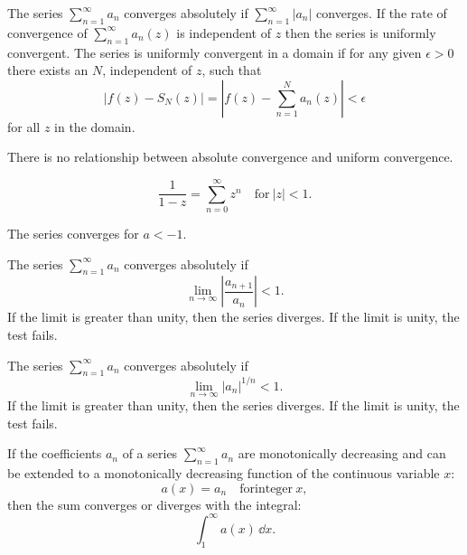 \begin{QuizSolution}
  \label{quiz solution absolute uniform convergence}
  The series $\sum_{n=1}^\infty a_n$ converges absolutely if $\sum_{n=1}^\infty |a_n|$
  converges.
  If the rate of convergence of $\sum_{n=1}^\infty a_n(z)$ is independent of $z$ then 
  the series is uniformly convergent.  
  The series is uniformly convergent in a domain if for any given 
  $\epsilon > 0$ there exists an $N$, independent of $z$, such that
  \[
  |f(z) - S_{N}(z)|
  = \left|f(z) - \sum_{n=1}^{N} a_n(z) \right| < \epsilon
  \]
  for all $z$ in the domain.

  There is no relationship between absolute convergence and 
  uniform convergence.
\end{QuizSolution}


\begin{QuizSolution}
  \label{quiz solution geometric series}
  \[
  \frac{1}{1-z} = \sum_{n=0}^\infty z^n \quad \mathrm{for}\ |z| < 1.
  \]
\end{QuizSolution}


\begin{QuizSolution}
  \label{quiz solution convergence na}
  The series converges for $a < -1$.
\end{QuizSolution}


\begin{QuizSolution}
  \label{quiz solution ratio root convergence}
  The series $\sum_{n=1}^\infty a_n$ converges absolutely if
  \[
  \lim_{n \to \infty} \left| \frac{a_{n+1}}{a_n} \right| < 1.
  \]
  If the limit is greater than unity, then the series diverges.  If the
  limit is unity, the test fails.

  The series $\sum_{n=1}^\infty a_n$ converges absolutely if
  \[
  \lim_{n \to \infty} |a_n|^{1/n} < 1.
  \]
  If the limit is greater than unity, then the series diverges.  If the
  limit is unity, the test fails.
\end{QuizSolution}


\begin{QuizSolution}
  \label{quiz solution integral convergence test}
  If the coefficients $a_n$ of a series $\sum_{n=1}^\infty a_n$
  are monotonically decreasing and
  can be extended to a monotonically decreasing function of the continuous
  variable $x$:
  \[
  a(x) = a_n \quad \mathrm{for integer}\ x,
  \]
  then the sum converges or diverges with the integral:
  \[
  \int_1^\infty a(x) \,\dd x.
  \]
\end{QuizSolution}






\raggedbottom
